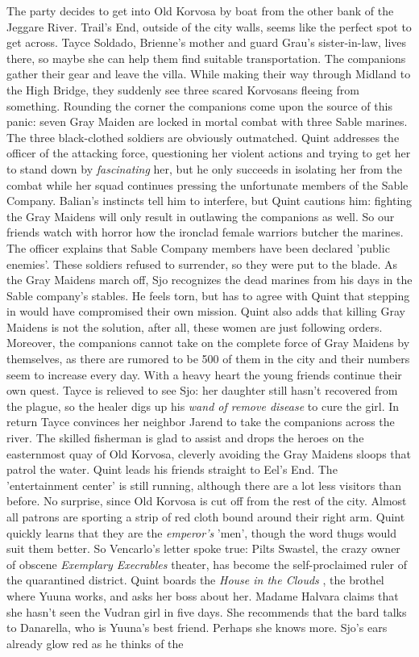 The party decides to get into Old Korvosa by boat from the other bank of the Jeggare River. Trail's End, outside of the city walls, seems like the perfect spot to get across. Tayce Soldado, Brienne's mother and guard Grau's sister-in-law, lives there, so maybe she can help them find suitable transportation. The companions gather their gear and leave the villa. While making their way through Midland to the High Bridge, they suddenly see three scared Korvosans fleeing from something. Rounding the corner the companions come upon the source of this panic: seven Gray Maiden are locked in mortal combat with three Sable marines. The three black-clothed soldiers are obviously outmatched. Quint addresses the officer of the attacking force, questioning her violent actions and trying to get her to stand down by {\itshape fascinating} her, but he only succeeds in isolating her from the combat while her squad continues pressing the unfortunate members of the Sable Company. Balian's instincts tell him to interfere, but Quint cautions him: fighting the Gray Maidens will only result in outlawing the companions as well. So our friends watch with horror how the ironclad female warriors butcher the marines. The officer explains that Sable Company members have been declared 'public enemies'. These soldiers refused to surrender, so they were put to the blade. As the Gray Maidens march off, Sjo recognizes the dead marines from his days in the Sable company's stables. He feels torn, but has to agree with Quint that stepping in would have compromised their own mission. Quint also adds that killing Gray Maidens is not the solution, after all, these women are just following orders. Moreover, the companions cannot take on the complete force of Gray Maidens by themselves, as there are rumored to be 500 of them in the city and their numbers seem to increase every day. With a heavy heart the young friends continue their own quest. Tayce is relieved to see Sjo: her daughter still hasn't recovered from the plague, so the healer digs up his {\itshape wand of remove disease} to cure the girl. In return Tayce convinces her neighbor Jarend to take the companions across the river. The skilled fisherman is glad to assist and drops the heroes on the easternmost quay of Old Korvosa, cleverly avoiding the Gray Maidens sloops that patrol the water. Quint leads his friends straight to Eel's End. The 'entertainment center' is still running, although there are a lot less visitors than before. No surprise, since Old Korvosa is cut off from the rest of the city. Almost all patrons are sporting a strip of red cloth bound around their right arm. Quint quickly learns that they are the {\itshape emperor's} 'men', though the word thugs would suit them better. So Vencarlo's letter spoke true: Pilts Swastel, the crazy owner of obscene  {\itshape Exemplary Execrables} theater, has become the self-proclaimed ruler of the quarantined district. Quint boards the  {\itshape House in the Clouds} , the brothel where Yuuna works, and asks her boss about her. Madame Halvara claims that she hasn't seen the Vudran girl in five days. She recommends that the bard talks to Danarella, who is Yuuna's best friend. Perhaps she knows more. Sjo's ears already glow red as he thinks of the 
